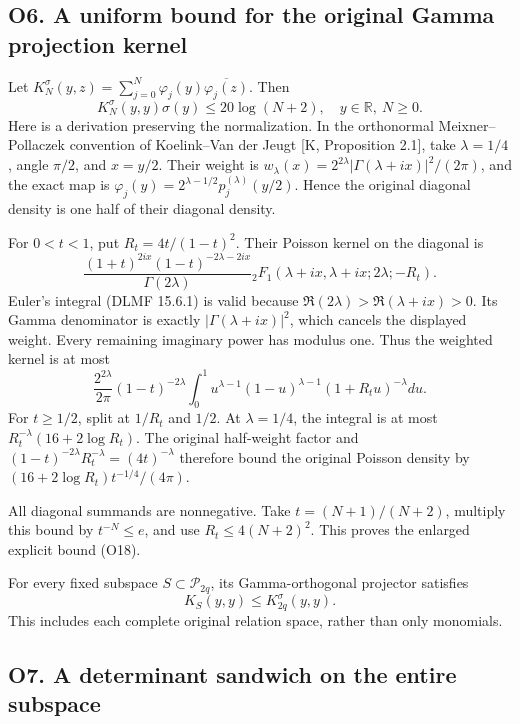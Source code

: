 \documentclass[
  11pt,
]{article}
\begin{document}
\subsection{O6. A uniform bound for the original Gamma projection
kernel}\label{o6.-a-uniform-bound-for-the-original-gamma-projection-kernel}

Let \(K_N^\sigma(y,z)=\sum_{j=0}^N\varphi_j(y)\overline{\varphi_j(z)}\).
Then \[
\boxed{K_N^\sigma(y,y)\sigma(y)\le20\log(N+2),
\quad y\in\mathbb R,\ N\ge0.}\tag{O18}
\] Here is a derivation preserving the normalization. In the orthonormal
Meixner--Pollaczek convention of Koelink--Van der Jeugt {[}K,
Proposition 2.1{]}, take \(\lambda=1/4\), angle \(\pi/2\), and
\(x=y/2\). Their weight is
\(w_\lambda(x)=2^{2\lambda}|\Gamma(\lambda+ix)|^2/(2\pi)\), and the
exact map is \(\varphi_j(y)=2^{\lambda-1/2}p_j^{(\lambda)}(y/2)\). Hence
the original diagonal density is one half of their diagonal density.

For \(0<t<1\), put \(R_t=4t/(1-t)^2\). Their Poisson kernel on the
diagonal is \[
\frac{(1+t)^{2ix}(1-t)^{-2\lambda-2ix}}{\Gamma(2\lambda)}
{}_2F_1(\lambda+ix,\lambda+ix;2\lambda;-R_t).
\] Euler's integral (DLMF 15.6.1) is valid because
\(\Re(2\lambda)>\Re(\lambda+ix)>0\). Its Gamma denominator is exactly
\(|\Gamma(\lambda+ix)|^2\), which cancels the displayed weight. Every
remaining imaginary power has modulus one. Thus the weighted kernel is
at most \[
\frac{2^{2\lambda}}{2\pi}(1-t)^{-2\lambda}
\int_0^1u^{\lambda-1}(1-u)^{\lambda-1}(1+R_tu)^{-\lambda}du.
\] For \(t\ge1/2\), split at \(1/R_t\) and \(1/2\). At \(\lambda=1/4\),
the integral is at most \(R_t^{-\lambda}(16+2\log R_t)\). The original
half-weight factor and
\((1-t)^{-2\lambda}R_t^{-\lambda}=(4t)^{-\lambda}\) therefore bound the
original Poisson density by \((16+2\log R_t)t^{-1/4}/(4\pi)\).

All diagonal summands are nonnegative. Take \(t=(N+1)/(N+2)\), multiply
this bound by \(t^{-N}\le e\), and use \(R_t\le4(N+2)^2\). This proves
the enlarged explicit bound (O18).

For every fixed subspace \(S\subset\mathcal P_{2q}\), its
Gamma-orthogonal projector satisfies \[
K_S(y,y)\le K_{2q}^\sigma(y,y).\tag{O19}
\] This includes each complete original relation space, rather than only
monomials.

\subsection{O7. A determinant sandwich on the entire
subspace}\label{o7.-a-determinant-sandwich-on-the-entire-subspace}
\end{document}
